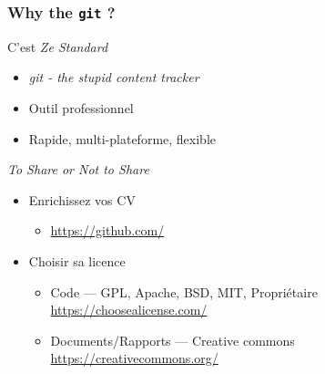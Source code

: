 \documentclass[table,tikz,12pt,svgnames]{beamer}
\begin{document}
\begin{frame}
\frametitle{Why the \texttt{git} ?}
\begin{block}{C'est \textit{Ze Standard}}
	\begin{itemize}
		\item \textit{git - the stupid content tracker}
		\item Outil professionnel
		\item Rapide, multi-plateforme, flexible
	\end{itemize}
\end{block}
\begin{block}{\textit{To Share or Not to Share}}
	\begin{itemize}
		\item Enrichissez vos CV
		\begin{itemize}
			\item \url{https://github.com/}
		\end{itemize}
		\item Choisir sa licence
		\begin{itemize}
			\item Code --- GPL, Apache, BSD, MIT, Propriétaire \url{https://choosealicense.com/}
			\item Documents/Rapports --- Creative commons \url{https://creativecommons.org/}
		\end{itemize}
	\end{itemize}
\end{block}
\end{frame}
\end{document}
